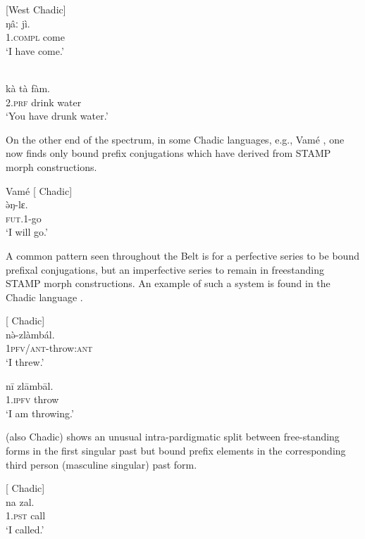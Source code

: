 \documentclass[output=paper]{langsci/langscibook}
\begin{document}
\largerpage[-2] %
\ea\label{ex:anderson:41}
  \citep[38]{Burquest1973}         [West Chadic]\\
\gll ŋâː    jì.\\
1.\textsc{compl}  come\\
\glt  `I have come.'
\z

\ea\label{ex:anderson:42}
  \citep[173]{Jungraithmayr1968}\\
\gll kà  tà  ƒàm.\\
\textsc{2.prf}  drink  water\\
\glt `You have drunk water.'
\z

On the other end of the spectrum, in some  Chadic languages, e.g., Vamé , one now finds only bound prefix conjugations which have derived from STAMP morph constructions. 

\ea\label{ex:anderson:43}
Vamé  \citep[11]{Kinnaird2006}          [ Chadic]\\
\gll \`{ə}ŋ-lɛ.\\
\textsc{fut}.1-go\\
\glt `I will go.'
\z

\largerpage[2]
A common pattern seen throughout the  Belt is for a perfective series to be bound prefixal conjugations, but an imperfective series to remain in freestanding STAMP morph constructions. An example of such a system is found in the  Chadic language  .

\ea\label{ex:anderson:44}
  \citep[7]{Gravina2001}           [ Chadic]\\
\ea\label{ex:anderson:44a}
\gll n\`{ə}-zlàmbál.    \\
  1\textsc{pfv/ant}-throw:\textsc{ant} \\
\glt `I threw.'    

\ex \label{ex:anderson:44b}
\gll n\={i}  zl\={a}mb\={a}l.\\
\textsc{1.ipfv}  throw\\
\glt `I am throwing.'  
\z
\z

 (also  Chadic) shows an unusual intra-pardigmatic split between free-standing forms in the first singular past but bound prefix elements in the corresponding third  person  (masculine singular) past form. 

 \ea\label{ex:anderson:45}
  \citep[8]{Gravina2007}          [ Chadic]\\
\ea\label{ex:anderson:45a}
\gll na    zal.      \\
  \textsc{1.pst}    call\\
\glt `I called.'
\end{document}
